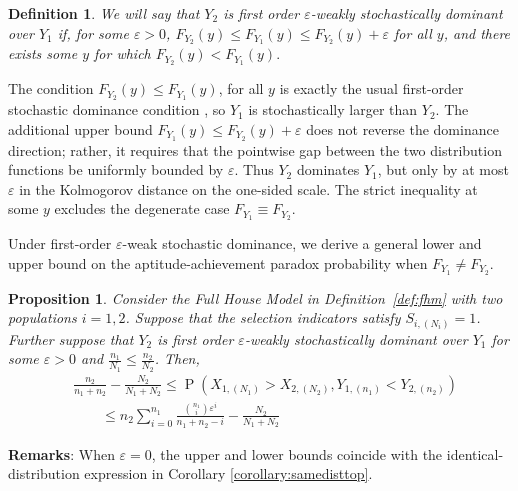 \documentclass[12pt]{article}
\DeclareMathOperator*{\Prob}{P}
\newtheorem{prop}[theorem]{Proposition}
\newtheorem{defn}[theorem]{Definition}
\begin{document}
\begin{defn}\label{def:stodom}
We will say that $Y_2$ is first order $\varepsilon$-weakly stochastically dominant over $Y_1$ if, for some $\varepsilon > 0$, 
$
  F_{Y_2}(y) \leq F_{Y_1}(y) \leq F_{Y_2}(y) + \varepsilon
$
for all $y$, and there exists some $y$ for which 
$
  F_{Y_2}(y) < F_{Y_1}(y).
$
\end{defn}

The condition $F_{Y_2}(y)\le F_{Y_1}(y)$, for all $y$ is exactly the usual first-order stochastic dominance condition \citep{quirk1962admissibility}, so $Y_1$ is stochastically larger than $Y_2$. The additional upper bound $F_{Y_1}(y)\le F_{Y_2}(y)+\varepsilon$ does not reverse the dominance direction; rather, it requires that the pointwise gap between the two distribution functions be uniformly bounded by $\varepsilon$. Thus $Y_2$ dominates $Y_1$, but only by at most $\varepsilon$ in the Kolmogorov distance on the one-sided scale. The strict inequality at some $y$ excludes the degenerate case $F_{Y_1}\equiv F_{Y_2}$.

Under first-order $\varepsilon$-weak stochastic dominance, we derive a general lower and upper bound on the aptitude-achievement paradox probability when $F_{Y_1}\neq F_{Y_2}$.

\begin{prop} \label{prop:weakstodom}
Consider the Full House Model in Definition~\ref{def:fhm} with two populations $i=1,2$. Suppose that the selection indicators satisfy $S_{i,(N_i)} = 1$. Further suppose that $Y_2$ is first order $\varepsilon$-weakly stochastically dominant over $Y_1$ for some $\varepsilon > 0$ and $\frac{n_1}{N_1} \leq \frac{n_2}{N_2}$. Then,
\begin{equation} \label{eq:paradox2}
\begin{split}
  &\frac{n_2}{n_1 + n_2} - \frac{N_2}{N_1 + N_2} \leq \Prob\left(X_{1,(N_1)} > X_{2,(N_2)}, Y_{1,(n_1)} < Y_{2,(n_2)}\right) \\
  &\qquad\leq n_2\sum_{i=0}^{n_1} \frac{{n_1 \choose i}\varepsilon^i}{n_1+n_2-i}- \frac{N_2}{N_1 + N_2}
\end{split}
\end{equation}
\end{prop}

\noindent \textbf{Remarks}:
When $\varepsilon=0$, the upper and lower bounds coincide with the identical-distribution expression in Corollary \ref{corollary:samedisttop}. 
\end{document}
